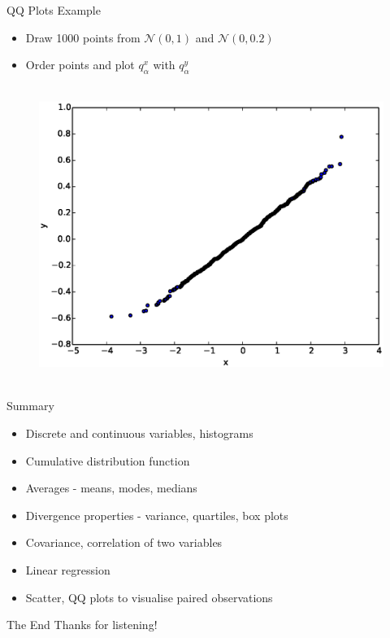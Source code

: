 \documentclass{beamer}
\begin{document}
\begin{frame}{QQ Plots Example}  
\begin{itemize}
 \item Draw 1000 points from $\mathcal{N}(0, 1)$ and $\mathcal{N}(0, 0.2)$ 
\item Order points and plot $q_\alpha^x$ with $q_\alpha^y$
\end{itemize}

   \begin{figure}[htp]
\mbox{
\includegraphics[width=0.5\linewidth]{QQPlot.eps}
}
\end{figure} 
\end{frame}

\begin{frame}{Summary} 
\begin{itemize} 
 \item Discrete and continuous variables, histograms  
 \item Cumulative distribution function 
\item Averages - means, modes, medians 
\item Divergence properties - variance, quartiles, box plots  
\item Covariance, correlation of two variables
\item Linear regression 
\item Scatter, QQ plots to visualise paired observations 
\end{itemize}
\end{frame}


\begin{frame}{The End} 
Thanks for listening!  
\end{frame}
\end{document}
